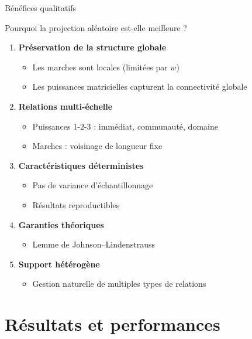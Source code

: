 \documentclass[9pt,aspectratio=169,professionalfonts]{beamer}
\begin{document}
\begin{frame}{Bénéfices qualitatifs}
\begin{block}{Pourquoi la projection aléatoire est-elle meilleure ?}
\begin{enumerate}
    \item \textbf{Préservation de la structure globale}
    \begin{itemize}
        \item Les marches sont locales (limitées par $w$)
        \item Les puissances matricielles capturent la connectivité globale
    \end{itemize}

    \item \textbf{Relations multi-échelle}
    \begin{itemize}
        \item Puissances 1-2-3 : immédiat, communauté, domaine
        \item Marches : voisinage de longueur fixe
    \end{itemize}

    \item \textbf{Caractéristiques déterministes}
    \begin{itemize}
        \item Pas de variance d'échantillonnage
        \item Résultats reproductibles
    \end{itemize}

    \item \textbf{Garanties théoriques}
    \begin{itemize}
        \item Lemme de Johnson–Lindenstrauss
    \end{itemize}

    \item \textbf{Support hétérogène}
    \begin{itemize}
        \item Gestion naturelle de multiples types de relations
    \end{itemize}
\end{enumerate}
\end{block}
\end{frame}

\section{Résultats et performances}
\end{document}
